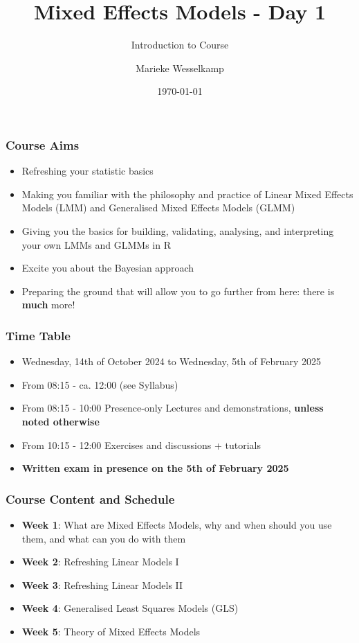 \documentclass{beamer}
\title{Mixed Effects Models - Day 1}
\subtitle{Introduction to Course}
\author{Marieke Wesselkamp}
\institute{Department of Biometry and Environmental Systems Analysis \\
Albert-Ludwigs-University of Freiburg (Germany)}
\date{\today}
\begin{document}
\frame{\titlepage}

\begin{frame}
\frametitle{Course Aims}
\begin{itemize}
    \item Refreshing your statistic basics
    \item Making you familiar with the philosophy and practice of Linear Mixed Effects Models (LMM) and Generalised Mixed Effects Models (GLMM)
    \item Giving you the basics for building, validating, analysing, and interpreting your own LMMs and GLMMs in R
    \item Excite you about the Bayesian approach
    \item Preparing the ground that will allow you to go further from here: there is \textbf{much} more!
\end{itemize}
\end{frame}

\begin{frame}
\frametitle{Time Table}
\begin{itemize}
    \item Wednesday, 14th of October 2024 to Wednesday, 5th of February 2025
    \item From 08:15 - ca. 12:00  (see Syllabus)
    \item From 08:15 - 10:00 Presence-only Lectures and demonstrations, \textbf{unless noted otherwise}
    \item From 10:15 - 12:00 Exercises and discussions + tutorials 
    \item \textbf{Written exam in presence on the 5th of February 2025}
\end{itemize}
\end{frame}

\begin{frame}
\frametitle{Course Content and Schedule}
\begin{itemize}
    \item \textbf{Week 1}: What are Mixed Effects Models, why and when should you use them, and what can you do with them
    \item \textbf{Week 2}: Refreshing Linear Models I
    \item \textbf{Week 3}: Refreshing Linear Models II
    \item \textbf{Week 4}: Generalised Least Squares Models (GLS)
    \item \textbf{Week 5}: Theory of Mixed Effects Models
\end{itemize}
\end{frame}
\end{document}
